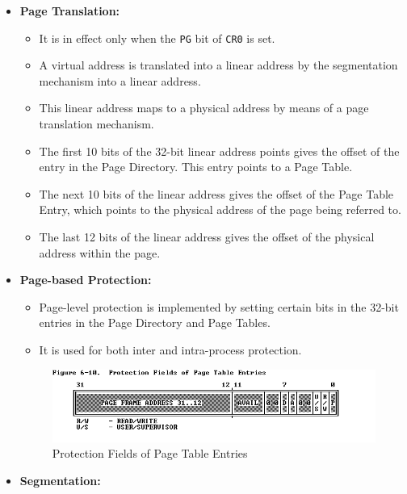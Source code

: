 \documentclass[]{article}
\makeatletter
\def\maxwidth{\ifdim\Gin@nat@width>\linewidth\linewidth
\else\Gin@nat@width\fi}
\let\Oldincludegraphics\includegraphics
\renewcommand{\includegraphics}[1]{\Oldincludegraphics[width=\maxwidth]{#1}}
\makeatother
\begin{document}
\begin{itemize}
\itemsep1pt\parskip0pt
\item
  \textbf{Page Translation:}

  \begin{itemize}
  \itemsep1pt\parskip0pt
  \item
    It is in effect only when the \texttt{PG} bit of \texttt{CR0} is
    set.
  \item
    A virtual address is translated into a linear address by the
    segmentation mechanism into a linear address.
  \item
    This linear address maps to a physical address by means of a page
    translation mechanism.
  \item
    The first 10 bits of the 32-bit linear address points gives the
    offset of the entry in the Page Directory. This entry points to a
    Page Table.
  \item
    The next 10 bits of the linear address gives the offset of the Page
    Table Entry, which points to the physical address of the page being
    referred to.
  \item
    The last 12 bits of the linear address gives the offset of the
    physical address within the page.
  \end{itemize}
\item
  \textbf{Page-based Protection:}

  \begin{itemize}
  \itemsep1pt\parskip0pt
  \item
    Page-level protection is implemented by setting certain bits in the
    32-bit entries in the Page Directory and Page Tables.
  \item
    It is used for both inter and intra-process protection.
  \end{itemize}

  \begin{figure}[htbp]
  \centering
  \includegraphics{fig.jpg}
  \caption{Protection Fields of Page Table Entries}
  \end{figure}
\item
  \textbf{Segmentation:}


\end{itemize}
\end{document}
